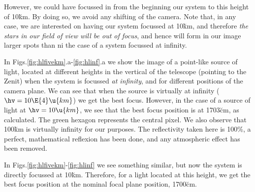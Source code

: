 However, we could have focussed in from the beginning our system to
this height of 10\u{km}. By doing so, we avoid any shifting of the
camera. Note that, in any case, we are interested on having our system
focussed at 10\u{km}, and therefore \emph{the stars in our field of
  view will be out of focus}, and hence will form in our image larger
spots than ni the case of a system focussed at infinity.

\colldeltafig

In Figs.\ref{fig:hlfivekm}.a-\ref{fig:hlinf}.a we show the image of a
point-like source of light, located at different heights \hv in the
vertical of the telescope (pointing to the Zenit) when the system is
focussed \emph{at infinity}, and for different positions of the camera
plane. We can see that when the source is virtually at infinity
($\hv=10\E{4}\u{km}$) we get the best focus. However, in the case of a
source of light at $\hv=10\u{km}$, we see that the best focus position
is at 1703\u{cm}, as calculated. The green hexagon represents the
central pixel. We also observe that 100\u{km} is virtually infinity
for our purposes. The reflectivity taken here is 100\%, a perfect,
mathematical reflexion has been done, and any atmospheric effect has
been removed.











\hlfivekmfig
 
\hltenkmfig
 
\hltwelvekmfig
 
\hlhundredkmfig
 
\hlinffig

\Mspotsfig

\afterpage{\clearpage}

In Figs.\ref{fig:hlfivekm}-\ref{fig:hlinf} we see something
similar, but now the system is directly focussed at 10\u{km}.
Therefore, for a light located at this height, we get the best focus
position at the nominal focal plane position, 1700\u{cm}. 

